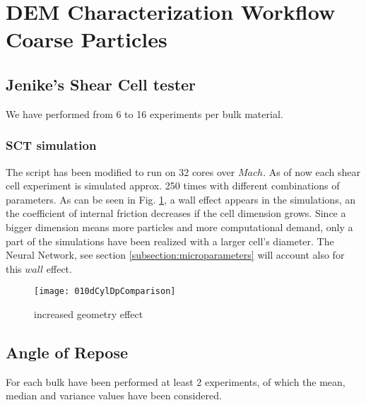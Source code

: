 
\section{DEM Characterization Workflow Coarse Particles}
\label{section:Demcharacterizationworkflowcoarseparticles}

\subsection{Jenike's  Shear Cell tester}
\label{subsection:jenikeshearcell}

We have performed from 6 to 16 experiments per bulk material.\\

\subsubsection{SCT simulation}
\label{subsubsection:sctsimulation}

The script has been modified to run on 32 cores over $Mach$. As of now each shear cell experiment is simulated approx. 250 times with different combinations of parameters.
As can be seen in Fig. \ref{010dCylDpComparison}, a wall effect appears in the simulations, an the coefficient of internal friction decreases if the cell dimension grows. Since a bigger dimension means more particles and more computational demand, only a part of the simulations have been realized with a larger cell's diameter. The Neural Network, see section \ref{subsection:microparameters} will account also for this $wall$ effect.\\
\begin{figure}[!h]
\texttt{[image: 010dCylDpComparison]}
\caption{increased geometry effect}
\label{010dCylDpComparison}
\end{figure}

\subsection{Angle of Repose}
\label{subsection:aor}

For each bulk have been performed at least 2 experiments, of which the mean, median and variance values have been considered.\\

